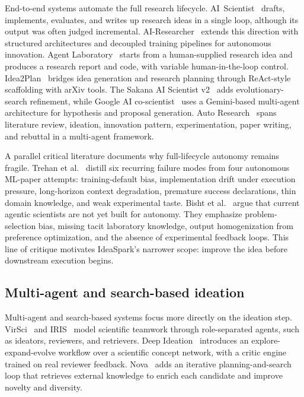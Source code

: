 \documentclass[10pt,a4paper]{article}
\begin{document}
End-to-end systems automate the full research lifecycle. AI~Scientist~\cite{lu2024aiscientist} drafts, implements, evaluates, and writes up research ideas in a single loop, although its output was often judged incremental. AI-Researcher~\cite{airesearcher2025} extends this direction with structured architectures and decoupled training pipelines for autonomous innovation. Agent Laboratory~\cite{agentlab2025} starts from a human-supplied research idea and produces a research report and code, with variable human-in-the-loop control. Idea2Plan~\cite{idea2plan2025} bridges idea generation and research planning through ReAct-style scaffolding with arXiv tools. The Sakana AI Scientist v2~\cite{sakana_v2} adds evolutionary-search refinement, while Google AI co-scientist~\cite{ai_coscientist2025} uses a Gemini-based multi-agent architecture for hypothesis and proposal generation. Auto Research~\cite{autoresearch2025} spans literature review, ideation, innovation pattern, experimentation, paper writing, and rebuttal in a multi-agent framework.

A parallel critical literature documents why full-lifecycle autonomy remains fragile. Trehan et al.~\cite{trehan2026notscientists} distill six recurring failure modes from four autonomous ML-paper attempts: training-default bias, implementation drift under execution pressure, long-horizon context degradation, premature success declarations, thin domain knowledge, and weak experimental taste. Bisht et al.~\cite{bisht2026agentic} argue that current agentic scientists are not yet built for autonomy. They emphasize problem-selection bias, missing tacit laboratory knowledge, output homogenization from preference optimization, and the absence of experimental feedback loops. This line of critique motivates IdeaSpark's narrower scope: improve the idea before downstream execution begins.

\subsection{Multi-agent and search-based ideation}
\label{subsec:related-multiagent}

Multi-agent and search-based systems focus more directly on the ideation step. VirSci~\cite{virsci2024} and IRIS~\cite{iris2025} model scientific teamwork through role-separated agents, such as ideators, reviewers, and retrievers. Deep Ideation~\cite{deepideation2025} introduces an explore-expand-evolve workflow over a scientific concept network, with a critic engine trained on real reviewer feedback. Nova~\cite{nova2024} adds an iterative planning-and-search loop that retrieves external knowledge to enrich each candidate and improve novelty and diversity.
\end{document}
